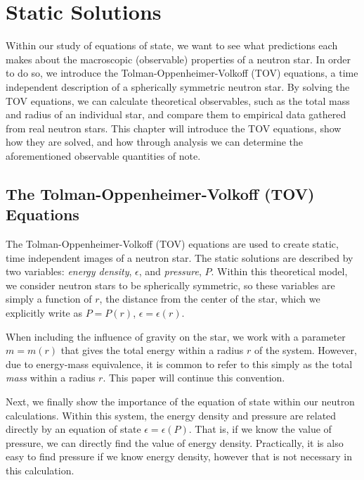 \chapter{Static Solutions}

Within our study of equations of state, we want to see what predictions each makes about the macroscopic (observable) properties of a neutron star. In order to do so, we introduce the Tolman-Oppenheimer-Volkoff (TOV) equations, a time independent description of a spherically symmetric neutron star. By solving the TOV equations, we can calculate theoretical observables, such as the total mass and radius of an individual star, and compare them to empirical data gathered from real neutron stars. This chapter will introduce the TOV equations, show how they are solved, and how through analysis we can determine the aforementioned observable quantities of note.

\section{The Tolman-Oppenheimer-Volkoff (TOV) Equations}

The Tolman-Oppenheimer-Volkoff (TOV) equations are used to create static, time independent images of a neutron star. The static solutions are described by two variables: \textit{energy density}, $\epsilon$, and \textit{pressure}, $P$. Within this theoretical model, we consider neutron stars to be spherically symmetric, so these variables are simply a function of $r$, the distance from the center of the star, which we explicitly write as $P = P(r)$, $\epsilon = \epsilon(r)$. 

When including the influence of gravity on the star, we work with a parameter $m = m(r)$ that gives the total energy within a radius $r$ of the system. However, due to energy-mass equivalence, it is common to refer to this simply as the total \textit{mass} within a radius $r$. This paper will continue this convention.

Next, we finally show the importance of the equation of state within our neutron calculations. Within this system, the energy density and pressure are related directly by an equation of state $\epsilon = \epsilon(P)$. That is, if we know the value of pressure, we can directly find the value of energy density. Practically, it is also easy to find pressure if we know energy density, however that is not necessary in this calculation.

